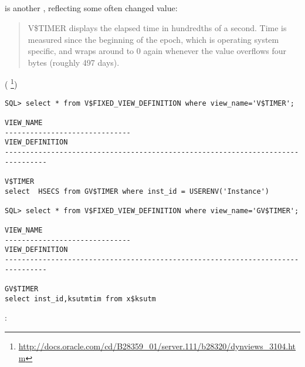 \subsection{ \oracle}

 
{is another , reflecting some often changed value:}

\begin{framed}
\begin{quotation}
V\$TIMER displays the elapsed time in hundredths of a second. Time is measured since the beginning of the epoch, 
which is operating system specific, and wraps around to 0 again whenever the value overflows four bytes 
(roughly 497 days).
\end{quotation}
\end{framed}(
\footnote{\url{http://docs.oracle.com/cd/B28359_01/server.111/b28320/dynviews_3104.htm}})



\begin{lstlisting}
SQL> select * from V$FIXED_VIEW_DEFINITION where view_name='V$TIMER';

VIEW_NAME
------------------------------
VIEW_DEFINITION
--------------------------------------------------------------------------------

V$TIMER
select  HSECS from GV$TIMER where inst_id = USERENV('Instance')

SQL> select * from V$FIXED_VIEW_DEFINITION where view_name='GV$TIMER';

VIEW_NAME
------------------------------
VIEW_DEFINITION
--------------------------------------------------------------------------------

GV$TIMER
select inst_id,ksutmtim from x$ksutm
\end{lstlisting}

:


